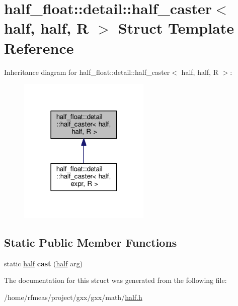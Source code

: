 \hypertarget{structhalf__float_1_1detail_1_1half__caster_3_01half_00_01half_00_01R_01_4}{}\section{half\+\_\+float\+:\+:detail\+:\+:half\+\_\+caster$<$ half, half, R $>$ Struct Template Reference}
\label{structhalf__float_1_1detail_1_1half__caster_3_01half_00_01half_00_01R_01_4}


Inheritance diagram for half\+\_\+float\+:\+:detail\+:\+:half\+\_\+caster$<$ half, half, R $>$\+:
\nopagebreak
\begin{figure}[H]
\begin{center}
\leavevmode
\includegraphics[width=178pt]{structhalf__float_1_1detail_1_1half__caster_3_01half_00_01half_00_01R_01_4__inherit__graph}
\end{center}
\end{figure}
\subsection*{Static Public Member Functions}
\begin{DoxyCompactItemize}
\item 
static \hyperlink{classhalf__float_1_1half}{half} {\bfseries cast} (\hyperlink{classhalf__float_1_1half}{half} arg)\hypertarget{structhalf__float_1_1detail_1_1half__caster_3_01half_00_01half_00_01R_01_4_afaaa63731da3198dc70a01cd784ac078}{}\label{structhalf__float_1_1detail_1_1half__caster_3_01half_00_01half_00_01R_01_4_afaaa63731da3198dc70a01cd784ac078}

\end{DoxyCompactItemize}


The documentation for this struct was generated from the following file\+:\begin{DoxyCompactItemize}
\item 
/home/rfmeas/project/gxx/gxx/math/\hyperlink{half_8h}{half.\+h}\end{DoxyCompactItemize}
